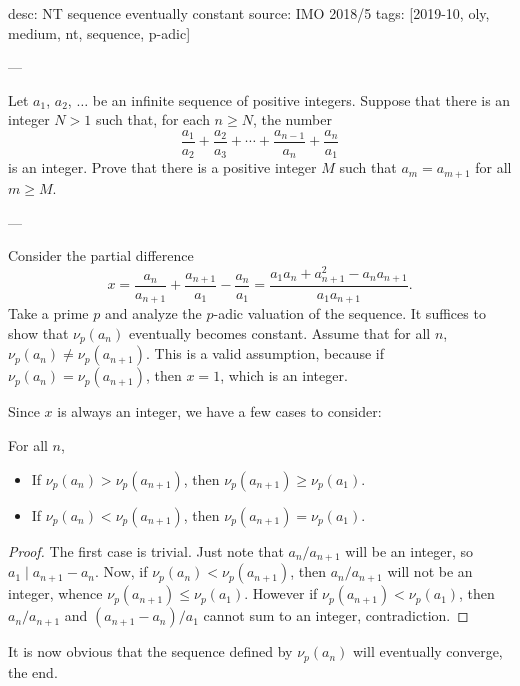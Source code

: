 desc: NT sequence eventually constant
source: IMO 2018/5
tags: [2019-10, oly, medium, nt, sequence, p-adic]

---

Let $a_1$, $a_2$, $\ldots$ be an infinite sequence of positive integers. Suppose that there is an integer $N>1$ such that, for each $n\ge N$, the number \[\frac{a_1}{a_2}+\frac{a_2}{a_3}+\cdots+\frac{a_{n-1}}{a_n}+\frac{a_n}{a_1}\]
is an integer. Prove that there is a positive integer $M$ such that $a_m=a_{m+1}$ for all $m\ge M$.

---

Consider the partial difference \[x=\frac{a_n}{a_{n+1}}+\frac{a_{n+1}}{a_1}-\frac{a_n}{a_1}=\frac{a_1a_n+a_{n+1}^2-a_na_{n+1}}{a_1a_{n+1}}.\]
Take a prime $p$ and analyze the $p$-adic valuation of the sequence. It suffices to show that $\nu_p(a_n)$ eventually becomes constant. Assume that for all $n$, $\nu_p(a_n)\ne\nu_p(a_{n+1})$. This is a valid assumption, because if $\nu_p(a_n)=\nu_p(a_{n+1})$, then $x=1$, which is an integer.

Since $x$ is always an integer, we have a few cases to consider:
\begin{iclaim*}
    For all $n$,
    \begin{itemize}
        \item If $\nu_p(a_n)>\nu_p(a_{n+1})$, then $\nu_p(a_{n+1})\ge\nu_p(a_1)$.
        \item If $\nu_p(a_n)<\nu_p(a_{n+1})$, then $\nu_p(a_{n+1})=\nu_p(a_1)$.
    \end{itemize}
\end{iclaim*}
\begin{proof}
    The first case is trivial. Just note that $a_n/a_{n+1}$ will be an integer, so $a_1\mid a_{n+1}-a_n$. Now, if $\nu_p(a_n)<\nu_p(a_{n+1})$, then $a_n/a_{n+1}$ will not be an integer, whence $\nu_p(a_{n+1})\le\nu_p(a_1)$. However if $\nu_p(a_{n+1})<\nu_p(a_1)$, then $a_n/a_{n+1}$ and $(a_{n+1}-a_n)/a_1$ cannot sum to an integer, contradiction.
\end{proof}

It is now obvious that the sequence defined by $\nu_p(a_n)$ will eventually converge, the end.
